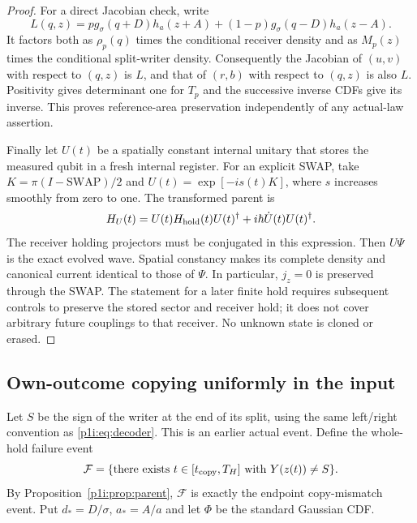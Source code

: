 \documentclass[11pt]{article}
\numberwithin{equation}{section}
\theoremstyle{definition}
\theoremstyle{remark}
\begin{document}
\begin{proof}
For a direct Jacobian check, write
\[
 L(q,z)=p g_\sigma(q+D)h_a(z+A)
       +(1-p)g_\sigma(q-D)h_a(z-A).
\]
It factors both as $\rho_p(q)$ times the conditional receiver density and
as $M_p(z)$ times the conditional split-writer density. Consequently the
Jacobian of $(u,v)$ with respect to $(q,z)$ is $L$, and that of $(r,b)$
with respect to $(q,z)$ is also $L$. Positivity gives determinant one for
$T_p$ and the successive inverse CDFs give its inverse. This proves
reference-area preservation independently of any actual-law assertion.

Finally let $U(t)$ be a spatially constant internal unitary that stores
the measured qubit in a fresh internal register. For an explicit SWAP,
take $K=\pi(I-\mathrm{SWAP})/2$ and
$U(t)=\exp[-i s(t)K]$, where $s$ increases smoothly from zero to one.
The transformed parent is
\begin{equation}\label{p1i:eq:swap}
 H_U(t)=U(t)H_{\rm hold}(t)U(t)^\dagger
                +i\hbar\dot U(t)U(t)^\dagger.
\end{equation}
The receiver holding projectors must be conjugated in this expression.
Then $U\Psi$ is the exact evolved wave. Spatial constancy makes its
complete density and canonical current identical to those of $\Psi$.
In particular, $j_z=0$ is preserved through the SWAP. The statement for a
later finite hold requires subsequent controls to preserve the stored
sector and receiver hold; it does not cover arbitrary future couplings
to that receiver. No unknown state is cloned or erased.
\end{proof}

\subsection{Own-outcome copying uniformly in the input}

Let $S$ be the sign of the writer at the end of its split, using the same
left/right convention as \eqref{p1i:eq:decoder}. This is an earlier actual
event. Define the whole-hold failure event
\[
 \mathcal F=\{\text{there exists }t\in[t_{\rm copy},T_H]
                         \text{ with }Y(z(t))\ne S\}.
\]
By Proposition~\ref{p1i:prop:parent}, $\mathcal F$ is exactly the endpoint
copy-mismatch event. Put $d_*=D/\sigma$, $a_*=A/a$ and let $\Phi$ be the
standard Gaussian CDF.
\end{document}
